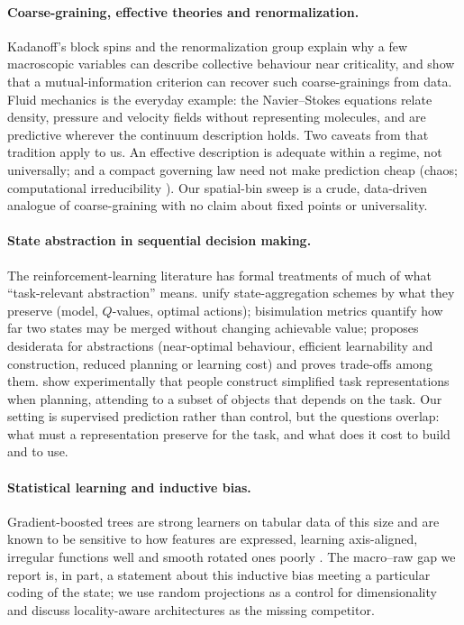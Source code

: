 \documentclass[11pt,a4paper]{article}
\begin{document}
\paragraph{Coarse-graining, effective theories and renormalization.}
Kadanoff's block spins \citep{kadanoff1966} and the renormalization group
explain why a few macroscopic variables can describe collective behaviour near
criticality, and \citet{kochjanusz2018} show that a mutual-information
criterion can recover such coarse-grainings from data. Fluid mechanics is the
everyday example: the Navier--Stokes equations relate density, pressure and
velocity fields without representing molecules, and are predictive wherever
the continuum description holds. Two caveats from that tradition apply to us.
An effective description is adequate within a regime, not universally; and a
compact governing law need not make prediction cheap (chaos; computational
irreducibility \citep{wolfram1985}). Our spatial-bin sweep is a crude,
data-driven analogue of coarse-graining with no claim about fixed points or
universality.

\paragraph{State abstraction in sequential decision making.}
The reinforcement-learning literature has formal treatments of much of what
``task-relevant abstraction'' means. \citet{li2006} unify state-aggregation
schemes by what they preserve (model, $Q$-values, optimal actions);
bisimulation metrics \citep{ferns2004} quantify how far two states may be
merged without changing achievable value; \citet{abel2020} proposes desiderata
for abstractions (near-optimal behaviour, efficient learnability and
construction, reduced planning or learning cost) and proves trade-offs among
them. \citet{ho2022} show experimentally that people construct simplified task
representations when planning, attending to a subset of objects that depends on
the task. Our setting is supervised prediction rather than control, but the
questions overlap: what must a representation preserve for the task, and what
does it cost to build and to use.

\paragraph{Statistical learning and inductive bias.}
Gradient-boosted trees are strong learners on tabular data of this size
\citep{grinsztajn2022,ke2017} and are known to be sensitive to how features
are expressed, learning axis-aligned, irregular functions well and smooth
rotated ones poorly \citep{grinsztajn2022}. The macro--raw gap we report is,
in part, a statement about this inductive bias meeting a particular coding of
the state; we use random projections \citep{bingham2001} as a control for
dimensionality and discuss locality-aware architectures as the missing
competitor.
\end{document}
